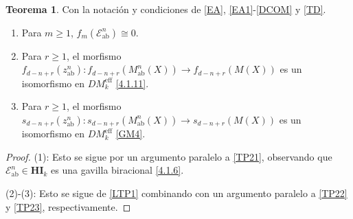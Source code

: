 \documentclass[10pt]{amsart}
\theoremstyle{definition}
\newtheorem{theorem}[definition]{Teorema}
\theoremstyle{remark}
\theoremstyle{definition}
\begin{document}
\begin{theorem}\label{TP4}
Con la notación y condiciones de \ref{EA}, \ref{EA1}-\ref{DCOM} y \ref{TD}.

\begin{enumerate}
\item\label{LTP1} Para $m\geq 1$, $f_{m}(\mathcal{E}^{n}_{\mathrm{ab}})\cong 0$.

\item\label{LTP2} Para $r\geq 1$, el morfismo $f_{d-n+r}(z^{n}_{\mathrm{ab}}):f_{d-n+r}(M^{n}_{\mathrm{ab}}(X))\to f_{d-n+r}(M(X))$ es un isomorfismo en $DM^{\mathrm{eff}}_{k}$ \ref{4.1.11}.

\item\label{LTP3} Para $r\geq 1$, el morfismo $s_{d-n+r}(z^{n}_{\mathrm{ab}}):s_{d-n+r}(M^{n}_{\mathrm{ab}}(X))\to s_{d-n+r}(M(X))$ es un isomorfismo en $DM^{\mathrm{eff}}_{k}$ \ref{GM4}.
\end{enumerate}
\end{theorem}

\begin{proof}
(1): Esto se sigue por un argumento paralelo a \ref{TP21}, observando que $\mathcal{E}^{n}_{\mathrm{ab}}\in\mathbf{HI}_{k}$ es una gavilla biracional \ref{4.1.6}.

(2)-(3): Esto se sigue de \ref{LTP1} combinando con un argumento paralelo a \ref{TP22} y \ref{TP23}, respectivamente.
\end{proof}
\end{document}
